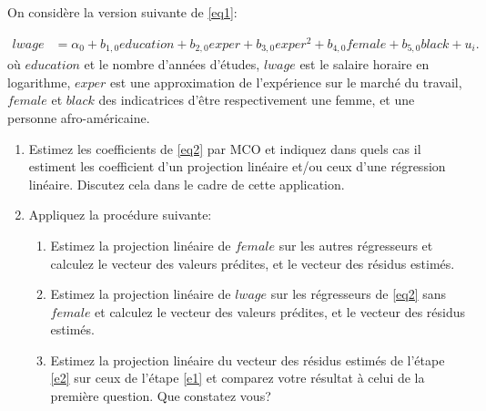 \documentclass[10pt, reqno]{amsart}
\begin{document}
\begin{enumerate}
\medskip

On considère la version suivante de \eqref{eq1}:

\begin{align}
  lwage &=  \alpha_0 + b_{1, 0} education + b_{2, 0} exper + b_{3, 0} exper^2 + b_{4, 0} female +  b_{5, 0} black + u_i.
  \label{eq2}
\end{align}
où $education$ et le nombre d'années d'études, $lwage$ est le salaire horaire en logarithme, $exper$ est une approximation de l'expérience 
sur le marché du travail, $female$ et $black$ des indicatrices d'être respectivement une femme, et une personne afro-américaine.

\begin{enumerate}
\item Estimez les coefficients de \eqref{eq2} par MCO et indiquez dans quels cas il estiment les coefficient d'un projection linéaire et/ou
 ceux d'une régression linéaire. Discutez cela dans le cadre de cette application.
\item Appliquez la procédure suivante:
\begin{enumerate}[label=(\arabic*)]
  \item Estimez la projection linéaire de $female$ sur les autres régresseurs et calculez le vecteur des valeurs prédites, et le vecteur des résidus estimés.
  \label{e1}
  \item Estimez la projection linéaire de $lwage$ sur les régresseurs de \eqref{eq2} sans $female$ et calculez le vecteur des valeurs prédites, et le vecteur des résidus estimés.
  \label{e2}
  \item Estimez la projection linéaire du vecteur des résidus estimés de l'étape \ref{e2} sur ceux de l'étape \ref{e1} et 
  comparez votre résultat à celui de la première question. Que constatez vous?
\end{enumerate}
\end{enumerate}


\end{enumerate}














%
%
 
\end{document}
